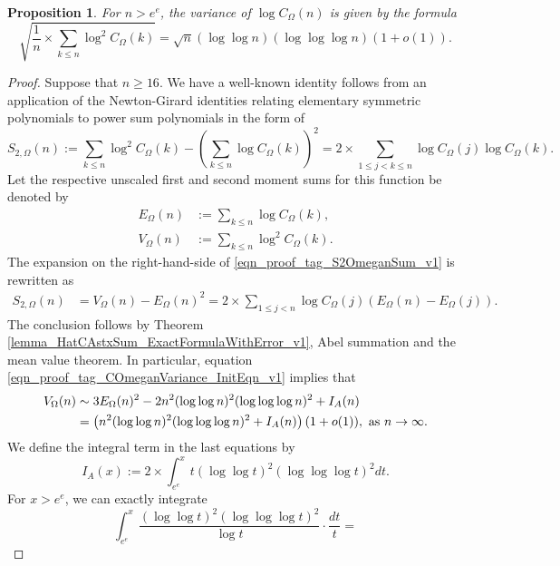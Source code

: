 \documentclass[11pt,reqno,a4letter]{article}
\newcommand{\hlocalref}[1]{\hyperref[#1]{\ref{#1}}}
\numberwithin{equation}{section}
\numberwithin{figure}{section}
\numberwithin{table}{section}
\theoremstyle{plain}
\newtheorem{prop}[theorem]{Proposition}
\numberwithin{theorem}{section}
\theoremstyle{definition}
\begin{document}
\begin{prop}
\label{prop_VarianceStat_for_COmegan_v1}
\label{prop_COmeganFunc_Variance_v1}
For $n > e^e$, the variance of $\log C_{\Omega}(n)$ is given by the formula 
\[
\sqrt{\frac{1}{n} \times \sum_{k \leq n} \log^2 C_{\Omega}(k)} = 
	\sqrt{n} (\log\log n) (\log\log\log n) \left(1 + o(1)\right). 
\]
\end{prop}
\begin{proof}
Suppose that $n \geq 16$. 
We have a well-known identity follows from an application of the 
Newton-Girard identities relating elementary symmetric polynomials 
to power sum polynomials in the form of 
\begin{equation}
\label{eqn_proof_tag_S2OmeganSum_v1}
S_{2,\Omega}(n) := \sum_{k \leq n} \log^2 C_{\Omega}(k) - 
     \left(\sum_{k \leq n} \log C_{\Omega}(k)\right)^2 = 
     2 \times \sum_{1 \leq j < k \leq n} \log C_{\Omega}(j) \log C_{\Omega}(k). 
\end{equation}
Let the respective unscaled first and second moment sums for this function 
be denoted by 
\begin{align*}
E_{\Omega}(n) & := \sum_{k \leq n} \log C_{\Omega}(k), \\ 
V_{\Omega}(n) & := \sum_{k \leq n} \log^2 C_{\Omega}(k). 
\end{align*}
The expansion on the right-hand-side of \eqref{eqn_proof_tag_S2OmeganSum_v1} is rewritten as 
\begin{align}
\label{eqn_proof_tag_COmeganVariance_InitEqn_v1}
S_{2,\Omega}(n) & = V_{\Omega}(n) - E_{\Omega}(n)^2 = 
     2 \times \sum_{1 \leq j < n} \log C_{\Omega}(j) \left(
     E_{\Omega}(n) - E_{\Omega}(j)\right). 
\end{align} 
The conclusion follows by 
Theorem \hlocalref{lemma_HatCAstxSum_ExactFormulaWithError_v1}, 
Abel summation and the mean value theorem. 
In particular, equation \eqref{eqn_proof_tag_COmeganVariance_InitEqn_v1} 
implies that 
\begin{align}
\notag
V_{\Omega}(n) & \sim 3E_{\Omega}(n)^2 - 2 n^2 (\log\log n)^2 (\log\log\log n)^2 + I_A(n) \\ 
\label{eqn_proof_tag_COmeganVariance_InitEqn_v2}
	& =  \left(n^2 (\log\log n)^2 (\log\log\log n)^2 + I_A(n)\right) (1+o(1)), 
	\text{ as } n \rightarrow \infty. 
\end{align} 
We define the integral term in the last equations by 
\[
I_A(x) := 2 \times \int_{e^e}^x t (\log\log t)^2 (\log\log\log t)^2 dt. 
\]
For $x > e^e$, we can exactly integrate 
\[
\int_{e^e}^x \frac{(\log\log t)^2 (\log\log\log t)^2}{\log t} \cdot \frac{dt}{t} = 
\]
\end{proof}
\end{document}
